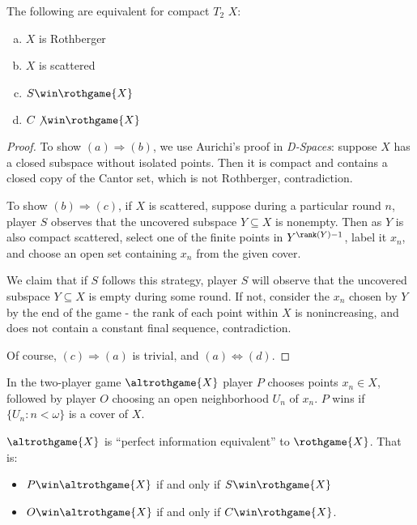   \begin{thm}
    The following are equivalent for compact $T_2$ $X$:
      \begin{enumerate}[(a)]
        \item $X$ is Rothberger
        \item $X$ is scattered
        \item $S\win\rothgame{X}$
        \item $C\not\win\rothgame{X}$
      \end{enumerate}
  \end{thm}

  \begin{proof}
    To show $(a)\Rightarrow(b)$, we use Aurichi's proof in \textit{D-Spaces}: suppose $X$ has a closed subspace without isolated points. Then it is compact and contains a closed copy of the Cantor set, which is not Rothberger, contradiction.

    To show $(b)\Rightarrow(c)$, if $X$ is scattered, suppose during a particular round $n$, player $S$ observes that the uncovered subspace $Y \subseteq X$ is nonempty. Then as $Y$ is also compact scattered,  select one of the finite points in $Y^{\rank(Y)-1}$, label it $x_n$, and choose an open set containing $x_n$ from the given cover.

    We claim that if $S$ follows this strategy, player $S$ will observe that the uncovered subspace $Y\subseteq X$ is empty during some round. If not, consider the $x_n$ chosen by $Y$ by the end of the game - the rank of each point within $X$ is nonincreasing, and does not contain a constant final sequence, contradiction.

    Of course, $(c)\Rightarrow(a)$ is trivial, and $(a)\Leftrightarrow(d)$.
  \end{proof}

  \begin{defn}
    In the two-player game $\altrothgame{X}$ player $P$ chooses points $x_n\in X$, followed by player $O$ choosing an open neighborhood $U_n$ of $x_n$. $P$ wins if $\{U_n:n<\omega\}$ is a cover of $X$.
  \end{defn}

  \begin{thm} $\altrothgame{X}$ is ``perfect information equivalent'' to $\rothgame{X}$. That is:

    \begin{itemize}
      \item $P\win\altrothgame{X}$ if and only if $S\win\rothgame{X}$
      \item $O\win\altrothgame{X}$ if and only if $C\win\rothgame{X}$.
    \end{itemize}
  \end{thm}

